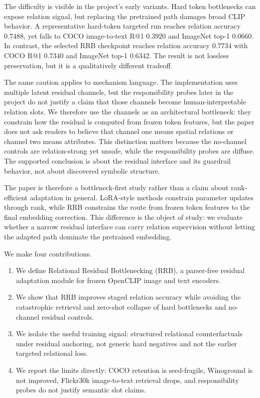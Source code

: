 The difficulty is visible in the project's early variants. Hard token bottlenecks can expose relation signal, but replacing the pretrained path damages broad CLIP behavior. A representative hard-token targeted run reaches relation accuracy $0.7488$, yet falls to COCO image-to-text R@1 $0.3920$ and ImageNet top-1 $0.0660$. In contrast, the selected RRB checkpoint reaches relation accuracy $0.7734$ with COCO R@1 $0.7340$ and ImageNet top-1 $0.6342$. The result is not lossless preservation, but it is a qualitatively different tradeoff.

The same caution applies to mechanism language. The implementation uses multiple latent residual channels, but the responsibility probes later in the project do not justify a claim that those channels become human-interpretable relation slots. We therefore use the channels as an architectural bottleneck: they constrain how the residual is computed from frozen token features, but the paper does not ask readers to believe that channel one means spatial relations or channel two means attributes. This distinction matters because the no-channel controls are relation-strong yet unsafe, while the responsibility probes are diffuse. The supported conclusion is about the residual interface and its guardrail behavior, not about discovered symbolic structure.

The paper is therefore a bottleneck-first study rather than a claim about rank-efficient adaptation in general. LoRA-style methods constrain parameter updates through rank, while RRB constrains the route from frozen token features to the final embedding correction. This difference is the object of study: we evaluate whether a narrow residual interface can carry relation supervision without letting the adapted path dominate the pretrained embedding.

We make four contributions.
\begin{enumerate}
    \item We define Relational Residual Bottlenecking (RRB), a parser-free residual adaptation module for frozen OpenCLIP image and text encoders.
    \item We show that RRB improves staged relation accuracy while avoiding the catastrophic retrieval and zero-shot collapse of hard bottlenecks and no-channel residual controls.
    \item We isolate the useful training signal: structured relational counterfactuals under residual anchoring, not generic hard negatives and not the earlier targeted relational loss.
    \item We report the limits directly: COCO retention is seed-fragile, Winoground is not improved, Flickr30k image-to-text retrieval drops, and responsibility probes do not justify semantic slot claims.
\end{enumerate}

